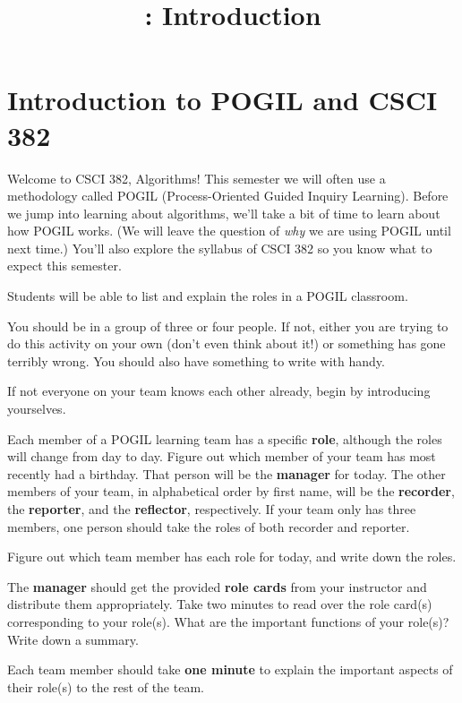 \documentclass{tufte-handout}
\title{\thecourse: Introduction}
\date{}
\begin{document}
\maketitle

\section{Introduction to POGIL and CSCI 382}

Welcome to CSCI 382, Algorithms!  This semester we will often use a
methodology called POGIL (Process-Oriented Guided Inquiry
Learning). Before we jump into
learning about algorithms, we'll take a bit of time to learn about how
POGIL works. (We will leave the question of \emph{why} we are using
POGIL until next time.)  You'll also explore the syllabus of CSCI 382
so you know what to expect this semester.

\begin{objective}
  Students will be able to list and explain the roles in a POGIL
  classroom.
\end{objective}


You should be in a group of three or four people.  If not, either you
are trying to do this activity on your own (don't even think about
it!) or something has gone terribly wrong.  You should also have
something to write with handy.

\begin{questions}
\item If not everyone on your team knows each other already, begin by
  introducing yourselves.
\end{questions}

Each member of a POGIL learning team has a specific \textbf{role},
although the roles will change from day to day.  Figure out which
member of your team has most recently had a birthday.  That person
will be the \textbf{manager} for today. The other members of your
team, in alphabetical order by first name, will be the
\textbf{recorder}, the \textbf{reporter}, and the \textbf{reflector},
respectively.  If your team only has three members, one person should
take the roles of both recorder and reporter.

\begin{questions}
\item Figure out which team member has each role for today, and write
  down the roles.
\item The \textbf{manager} should get the provided \textbf{role cards}
  from your instructor and distribute them appropriately.  Take two
  minutes to read over the role card(s) corresponding to your role(s).
  What are the important functions of your role(s)?  Write down a
  summary.
\item Each team member should take \textbf{one minute} to explain the
  important aspects of their role(s) to the rest of the team.
\end{questions}
\end{document}
